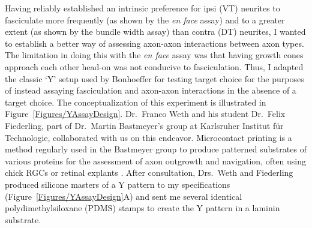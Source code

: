 \label{sec:YAssay}
Having reliably established an intrinsic preference for ipsi (VT) neurites to fasciculate more frequently (as shown by the \emph{en face} assay) and to a greater extent (as shown by the bundle width assay) than contra (DT) neurites, I wanted to establish a better way of assessing axon-axon interactions between axon types.
The limitation in doing this with the \emph{en face} assay was that having growth cones approach each other head-on was not conducive to fasciculation.
Thus, I adapted the classic `Y' setup used by Bonhoeffer for testing target choice \cite{bonhoeffer1985position} for the purposes of instead assaying fasciculation and axon-axon interactions in the absence of a target choice.
The conceptualization of this experiment is illustrated in Figure~\ref{Figures/YAssayDesign}.
Dr.~Franco Weth and his student Dr.~Felix Fiederling, part of Dr.~Martin Bastmeyer's group at Karlsruher Institut f\"ur Technologie, collaborated with us on this endeavor.
Microcontact printing is a method regularly used in the Bastmeyer group to produce patterned substrates of various proteins for the assessment of axon outgrowth and navigation, often using chick RGCs or retinal explants \cite{von2006microcontact}.
After consultation, Drs.~Weth and Fiederling produced silicone masters of a Y pattern to my specifications (Figure~\ref{Figures/YAssayDesign}A) and sent me several identical polydimethylsiloxane (PDMS) stamps to create the Y pattern in a laminin substrate.

